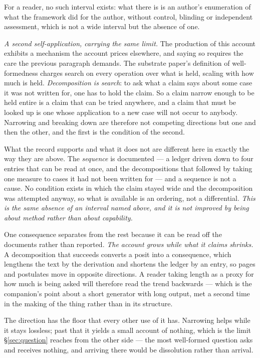\documentclass[11pt,a4paper]{article}
\theoremstyle{remark}\newtheorem{remark}[definition]{Remark}
\begin{document}
For a reader, no such interval exists: what there is is an author's enumeration of what the framework
did for the author, without control, blinding or independent assessment, which
is not a wide interval but the absence of one.

\emph{A second self-application, carrying the same limit.} The production of this account exhibits a
mechanism the account prices elsewhere, and saying so requires the care the previous paragraph
demands. The substrate paper's definition of well-formedness charges search on every operation over
what is held, scaling with how much is held. \emph{Decomposition is search}: to ask what a claim says
about some case it was not written for, one has to hold the claim. So a claim narrow enough to be held
entire is a claim that can be tried anywhere, and a claim that must be looked up is one whose
application to a new case will not occur to anybody. Narrowing and breaking down are therefore not
competing directions but one and then the other, and the first is the condition of the second.

What the record supports and what it does not are different here in exactly the way they are above.
The \emph{sequence} is documented --- a ledger driven down to four entries that can be read at once,
and the decompositions that followed by taking one measure to cases it had not been written for --- and
a sequence is not a cause. No condition exists in which the claim stayed wide and the decomposition was
attempted anyway, so what is available is an ordering, not a differential. \emph{This is the same
absence of an interval named above, and it is not improved by being about method rather than about
capability.}

One consequence separates from the rest because it can be read off the documents rather than reported.
\emph{The account grows while what it claims shrinks.} A decomposition that succeeds converts a posit
into a consequence, which lengthens the text by the derivation and shortens the ledger by an entry, so
pages and postulates move in opposite directions. A reader taking length as a proxy for how much is
being asked will therefore read the trend backwards --- which is the companion's point about a short
generator with long output, met a second time in the making of the thing rather than in its structure.

The direction has the floor that every other use of it has. Narrowing helps while it stays lossless;
past that it yields a small account of nothing, which is the limit \S\ref{sec:question} reaches from the
other side --- the most well-formed question asks and receives nothing, and arriving there would be
dissolution rather than arrival.
\end{document}
